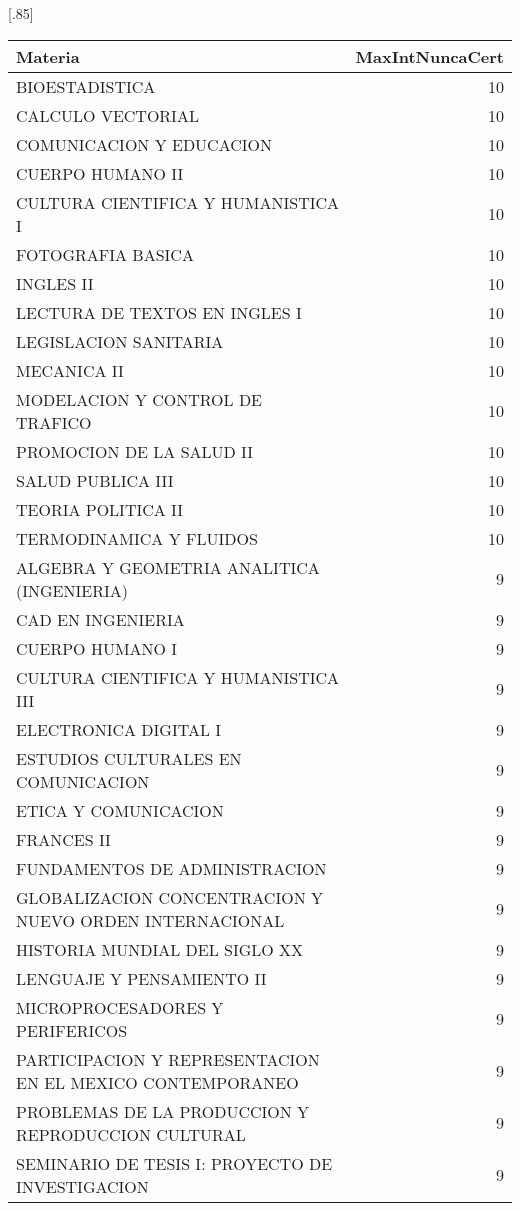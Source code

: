\documentclass[12pt]{article}
\begin{document}
\begin{table}[ht]
\centering
\scalebox{0.75}[.85]{
\begin{tabular}{lr}
  \hline
  Materia & MaxIntNuncaCert \\ 
  \hline
  BIOESTADISTICA & 10 \\ 
  CALCULO VECTORIAL & 10 \\ 
  COMUNICACION Y EDUCACION & 10 \\ 
  CUERPO HUMANO II & 10 \\ 
  CULTURA CIENTIFICA Y HUMANISTICA I & 10 \\ 
  FOTOGRAFIA BASICA & 10 \\ 
  INGLES II & 10 \\ 
  LECTURA DE TEXTOS EN INGLES I & 10 \\ 
  LEGISLACION SANITARIA & 10 \\ 
  MECANICA II & 10 \\ 
  MODELACION Y CONTROL DE TRAFICO & 10 \\ 
  PROMOCION DE LA SALUD II & 10 \\ 
  SALUD PUBLICA III & 10 \\ 
  TEORIA POLITICA II & 10 \\ 
  TERMODINAMICA Y FLUIDOS & 10 \\ 
  ALGEBRA Y GEOMETRIA ANALITICA (INGENIERIA) & 9 \\ 
  CAD EN INGENIERIA & 9 \\ 
  CUERPO HUMANO I & 9 \\ 
  CULTURA CIENTIFICA Y HUMANISTICA III & 9 \\ 
  ELECTRONICA DIGITAL I & 9 \\ 
  ESTUDIOS CULTURALES EN COMUNICACION & 9 \\ 
  ETICA Y COMUNICACION & 9 \\ 
  FRANCES II & 9 \\ 
  FUNDAMENTOS DE ADMINISTRACION & 9 \\ 
  GLOBALIZACION CONCENTRACION Y NUEVO ORDEN INTERNACIONAL & 9 \\ 
  HISTORIA MUNDIAL DEL SIGLO XX & 9 \\ 
  LENGUAJE Y PENSAMIENTO II & 9 \\ 
  MICROPROCESADORES Y PERIFERICOS & 9 \\ 
  PARTICIPACION Y REPRESENTACION EN EL MEXICO CONTEMPORANEO & 9 \\ 
  PROBLEMAS DE LA PRODUCCION Y REPRODUCCION CULTURAL & 9 \\ 
  SEMINARIO DE TESIS I: PROYECTO DE INVESTIGACION & 9 \\ 

\end{tabular}}
\end{table}
\end{document}
